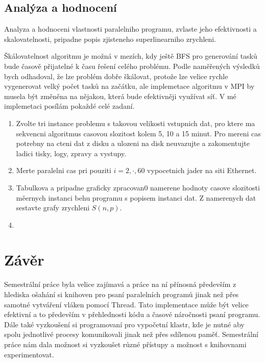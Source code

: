 \documentclass[]{article}
\begin{document}
\subsection{Analýza a hodnocení}


Analyza a hodnoceni vlastnosti paralelniho programu, zvlaste jeho efektivnosti a skalovatelnosti, pripadne popis zjisteneho superlinearniho zrychleni.

Škálovatelnost algoritmu je možná v mezích, kdy ještě BFS pro generování tasků bude časově přijatelné k času řešení celého problému. Podle naměřených výsledků bych odhadoval, že lze problém dobře škálovat, protože lze velice rychle vygenerovat velký počet tasků na začátku, ale implemetace algoritmu v MPI by musela být změněna na nějakou, která bude efektivněji využívat síť. V mé implemetaci posílám pokaždé celé zadaní.

\begin{enumerate}
\item Zvolte tri instance problemu s takovou velikosti vstupnich dat, pro ktere ma sekvencni 
algoritmus casovou slozitost kolem 5, 10 a 15 minut.
Pro mereni cas potrebny na cteni dat z disku a ulozeni na disk neuvazujte a zakomentujte
ladici tisky, logy, zpravy a vystupy.
\item Merte paralelni cas pri pouziti $i=2,\cdot,60$ vypocetnich jader na siti Ethernet.
\item Tabulkova a pripadne graficky zpracovan0 namerene hodnoty casove slozitosti měernych instanci behu programu s popisem instanci dat. Z namerenych dat sestavte grafy zrychleni $S(n,p)$. 
\item 

\end{enumerate}

\section{Závěr}

Semestrální práce byla velice zajímavá a práce na ní přínosná především z hlediska ošahání si knihoven pro psaní paralelních programů jinak než přes samotné vytváření vláken pomocí Thread. Tato implementace může být velice efektivní a to především v přehlednosti kódu a časové náročnosti psaní programu. Dále také vyzkoušení si programovaní pro vypočetní klastr, kde je nutné aby spolu jednotlivé procesy komunikovali jinak než přes sdílenou paměť. Semestrální práce nám dala možnost si vyzkoušet různé přístupy a možnost s knihovnami experimentovat.
\end{document}

